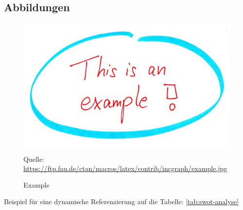 \subsection{Abbildungen}

\begin{figure}[H]
	\centering
	\includegraphics[width=15cm]{bilder/example.jpg}
	\caption{Example}
	\label{abb:example}
	Quelle: \url{https://ftp.fau.de/ctan/macros/latex/contrib/incgraph/example.jpg}
\end{figure}

Beispiel für eine dynamische Referenzierung auf die Tabelle:  \ref{tab:swot-analyse}